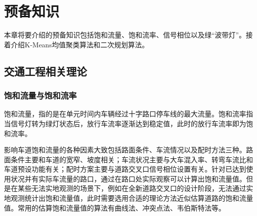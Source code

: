 \chapter{预备知识}
本章将要介绍的预备知识包括饱和流量、饱和流率、信号相位以及绿“波带灯”。接着介绍K-Means均值聚类算法和二次规划算法。
\section{交通工程相关理论}

\subsection{饱和流量与饱和流率}
饱和流量，指的是在单元时间内车辆经过十字路口停车线的最大流量\cite{wuzhen2008}。饱和流率指当信号灯转为绿灯状态后，放行车流率逐渐达到稳定值，此时的放行车流率即为饱和流率\cite{liuyi2010}。





影响车道饱和流量的各种因素大致包括路面条件、车流情况以及配时方法三种。路面条件主要和车道的宽窄、坡度相关；车流状况主要与大车混入率、转弯车流比和车道预设功能有关\cite{wuzhen2009}；配时方案主要与道路交叉口信号相位设置有关\cite{likeping2007}。针对已达到使用状况并有实际车流量的路口，通过在路口处实际观察可以计算出饱和流量值。但是在某些无法实地观测的场景下，例如在全新道路交叉口的设计阶段，无法通过实地观测统计出饱和流量值，此时需要选用合适的理论方法近似估算道路的饱和流量值\cite{shaochangqiao2011}。常用的估算饱和流量值的算法有曲线法\cite{1988Using}、冲突点法\cite{xuliqun2001}、韦伯斯特法\cite{wangjiawen2021}等。

